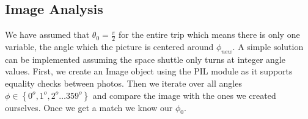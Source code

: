 \documentclass[reprint,english,notitlepage]{revtex4-2}
\begin{document}
\subsection{Image Analysis} \label{ssec: image analysis}
We have assumed that $ \theta_{0} = \frac{\pi}{2} $ for the entire trip which means there is only one variable, the angle which the picture is centered around $ \phi_{new} $.
A simple solution can be implemented assuming the space shuttle only turns at integer angle values.
First, we create an Image object using the PIL module as it supports equality checks between photos.
Then we iterate over all angles $ \phi \in  \left\{ 0^{o}, 1^{o}, 2^{o} \dots 359 ^{o} \right\}  $ and compare the image with the ones we created ourselves.
Once we get a match we know our $ \phi _{0} $.
\end{document}
